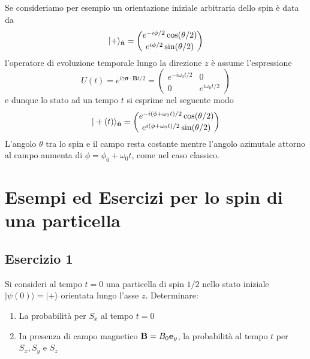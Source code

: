 Se consideriamo per esempio un orientazione iniziale arbitraria dello spin \`e data da
\begin{equation*}
	|+ \rangle_{\bold{\hat{n}}} = \binom{e^{-i \phi / 2} \cos (\theta / 2)}{e^{i \phi / 2} \sin (\theta / 2)}
\end{equation*}
l'operatore di evoluzione temporale lungo la direzione $z$ \`e assume l'espressione
\begin{equation*}
	U(t)=e^{i \gamma \boldsymbol{\sigma} \cdot \mathbf{B} t / 2}=\left(\begin{array}{cc}
e^{-i \omega_0 t / 2} & 0 \\
0 & e^{i \omega_0 t / 2}
\end{array}\right)
\end{equation*}
e dunque lo stato ad un tempo $t$ si esprime nel seguente modo
\begin{equation*}
	|+ (t) \rangle_{\bold{\hat{n}}} = \binom{e^{-i\left(\phi+\omega_0 t\right) / 2} \cos (\theta / 2)}{e^{i\left(\phi+\omega_0 t\right) / 2} \sin (\theta / 2)}
\end{equation*}
L'angolo $\theta$ tra lo spin e il campo resta costante mentre l'angolo azimutale attorno al campo aumenta di $\phi = \phi_0 + \omega_0t$, come nel caso classico.

\newpage 
\section{Esempi ed Esercizi per lo spin di una particella}

\subsection{Esercizio 1}

Si consideri al tempo $t = 0 $ una particella di spin $1/2$ nello stato iniziale  $|\psi(0) \rangle  = |+ \rangle $ orientata lungo l'asse $z$. Determinare:
\begin{enumerate}
	\item La probabilit\`a per $S_x$  al tempo $t=0$
	\item In presenza di campo magnetico $\bold{B} = B_0\bold{e}_y$, la probabilit\`a al tempo $t$ per $S_x,S_y$ e $S_z$  
\end{enumerate}

